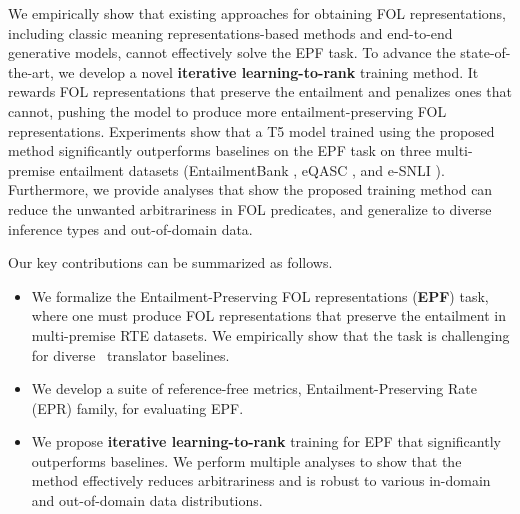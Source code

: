 We empirically show that existing approaches for obtaining FOL representations, including classic meaning representations-based methods and end-to-end generative models, cannot effectively solve the EPF task. To advance the state-of-the-art, we develop a novel \textbf{iterative learning-to-rank} training method. It rewards FOL representations that preserve the entailment and penalizes ones that cannot, pushing the model to produce more entailment-preserving FOL representations. Experiments show that a T5 \citep{t5} model trained using the proposed method significantly outperforms baselines on the EPF task on three multi-premise entailment datasets (EntailmentBank \citep{entailmentbank}, eQASC \citep{eqasc}, and e-SNLI \citep{esnli}). Furthermore, we provide analyses that show the proposed training method can reduce the unwanted arbitrariness in FOL predicates, and generalize to diverse inference types and out-of-domain data.

Our key contributions can be summarized as follows.

\begin{itemize}
    \item We formalize the Entailment-Preserving FOL representations (\textbf{EPF}) task, where one must produce FOL representations that preserve the entailment in multi-premise RTE datasets. We empirically show that the task is challenging for diverse \nltofol\ translator baselines.
    \item We develop a suite of reference-free metrics, Entailment-Preserving Rate (EPR) family, for evaluating EPF.
    \item We propose \textbf{iterative learning-to-rank} training for EPF that significantly outperforms baselines. We perform multiple analyses to show that the method effectively reduces arbitrariness and is robust to various in-domain and out-of-domain data distributions.
\end{itemize}





